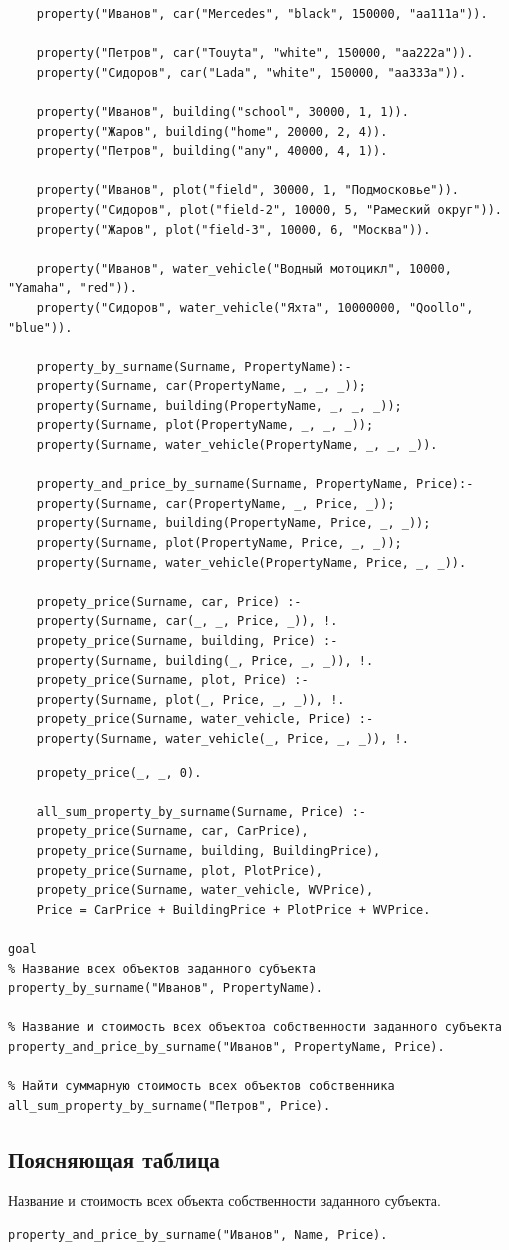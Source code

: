 \begin{lstlisting}	
	property("Иванов", car("Mercedes", "black", 150000, "aa111a")).
	
	property("Петров", car("Touyta", "white", 150000, "aa222a")).
	property("Сидоров", car("Lada", "white", 150000, "aa333a")).
	
	property("Иванов", building("school", 30000, 1, 1)).
	property("Жаров", building("home", 20000, 2, 4)).
	property("Петров", building("any", 40000, 4, 1)).
	
	property("Иванов", plot("field", 30000, 1, "Подмосковье")).
	property("Сидоров", plot("field-2", 10000, 5, "Рамеский округ")).
	property("Жаров", plot("field-3", 10000, 6, "Москва")).
	
	property("Иванов", water_vehicle("Водный мотоцикл", 10000, "Yamaha", "red")).
	property("Сидоров", water_vehicle("Яхта", 10000000, "Qoollo", "blue")).
	
	property_by_surname(Surname, PropertyName):-
	property(Surname, car(PropertyName, _, _, _));
	property(Surname, building(PropertyName, _, _, _));
	property(Surname, plot(PropertyName, _, _, _));
	property(Surname, water_vehicle(PropertyName, _, _, _)).
	
	property_and_price_by_surname(Surname, PropertyName, Price):-
	property(Surname, car(PropertyName, _, Price, _));
	property(Surname, building(PropertyName, Price, _, _));
	property(Surname, plot(PropertyName, Price, _, _));
	property(Surname, water_vehicle(PropertyName, Price, _, _)).
	
	propety_price(Surname, car, Price) :-
	property(Surname, car(_, _, Price, _)), !.
	propety_price(Surname, building, Price) :-
	property(Surname, building(_, Price, _, _)), !.
	propety_price(Surname, plot, Price) :-
	property(Surname, plot(_, Price, _, _)), !.
	propety_price(Surname, water_vehicle, Price) :-
	property(Surname, water_vehicle(_, Price, _, _)), !.        
\end{lstlisting}
\clearpage
\begin{lstlisting}
	propety_price(_, _, 0).
	
	all_sum_property_by_surname(Surname, Price) :-
	propety_price(Surname, car, CarPrice),
	propety_price(Surname, building, BuildingPrice),
	propety_price(Surname, plot, PlotPrice),
	propety_price(Surname, water_vehicle, WVPrice),
	Price = CarPrice + BuildingPrice + PlotPrice + WVPrice.

goal
% Название всех объектов заданного субъекта
property_by_surname("Иванов", PropertyName).

% Название и стоимость всех объектоа собственности заданного субъекта
property_and_price_by_surname("Иванов", PropertyName, Price).

% Найти суммарную стоимость всех объектов собственника
all_sum_property_by_surname("Петров", Price).
\end{lstlisting}

\subsection*{Поясняющая таблица}

Название и стоимость всех объекта собственности заданного субъекта.
\begin{lstlisting}
property_and_price_by_surname("Иванов", Name, Price).
\end{lstlisting}